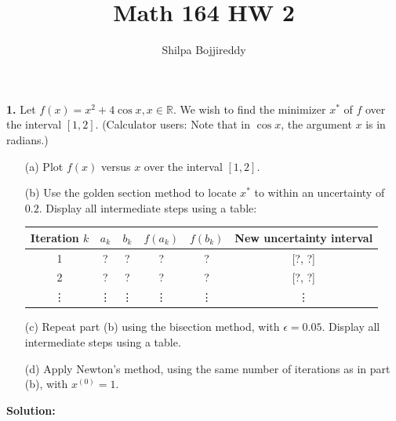 \documentclass[12pt]{article}
\begin{document}
\title{Math 164 HW 2}
\author{Shilpa Bojjireddy}
\maketitle


\begin{mybluebox}
    \textbf{1.} Let $f(x) = x^2 + 4\cos{x}, x \in \mathbb{R}$. We wish to find the minimizer $x^*$ of $f$ over the interval $[1,2]$. 
    (Calculator users: Note that in $\cos x$, the argument $x$ is in radians.)
    
    \begin{itemize}
        \item[(a)] Plot $f(x)$ versus $x$ over the interval $[1,2]$.
        
        \item[(b)] Use the golden section method to locate $x^*$ to within an uncertainty of $0.2$. Display all intermediate steps using a table:
        
        \begin{center}
        \begin{tabular}{|c|c|c|c|c|c|}
        \hline
        Iteration $k$ & $a_k$ & $b_k$ & $f(a_k)$ & $f(b_k)$ & New uncertainty interval \\
        \hline
        1 & ? & ? & ? & ? & [?, ?] \\
        2 & ? & ? & ? & ? & [?, ?] \\
        \vdots & \vdots & \vdots & \vdots & \vdots & \vdots \\
        \hline
        \end{tabular}
        \end{center}
        
        \item[(c)] Repeat part (b) using the bisection method, with $\epsilon = 0.05$. Display all intermediate steps using a table.
        
        \item[(d)] Apply Newton's method, using the same number of iterations as in part (b), with $x^{(0)} = 1$.
    \end{itemize}
\end{mybluebox} 
\textbf{Solution: } \\
\end{document}

